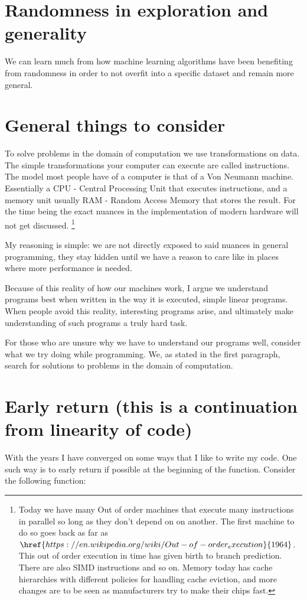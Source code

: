 \documentclass[a4paper]{article}
\begin{document}
\section{Randomness in exploration and generality}
We can learn much from how machine learning algorithms have been benefiting from randomness in order to not overfit into a specific dataset and remain more general.


\section{General things to consider}
To solve problems in the domain of computation we use transformations on data. The simple 
transformations your computer can execute are called instructions. The model most people 
have of a computer is that of a Von Neumann machine. Essentially a CPU - Central Processing 
Unit that executes instructions, and a memory unit usually RAM - Random Access Memory 
that stores the result. For the time being the exact nuances in the implementation of 
modern hardware will not get discussed. 
\footnote{Today we have many Out of order machines that execute many instructions in parallel so long as they don't depend on on another. The first machine to do so goes back as far as $\href{https://en.wikipedia.org/wiki/Out-of-order_execution}{1964}$. This out of order execution in time has given birth to branch prediction. There are also SIMD instructions and so on. Memory today has cache hierarchies with different policies for handling cache eviction, and more changes are to be seen as manufacturers try to make their chips fast.}  

My reasoning is simple: we are not directly exposed to said nuances in general programming, they stay hidden until we have a reason to care like in places where more performance is needed.

Because of this reality of how our machines work, I argue we understand programs best when written in the way it is executed, simple linear programs. When people avoid this reality, interesting programs arise, and ultimately make understanding of such programs a truly hard task.

For those who are unsure why we have to understand our programs well, consider what we try doing while programming. We, as stated in the first paragraph, search for solutions to problems in the domain of computation. 


\section{Early return (this is a continuation from linearity of code)}
With the years I have converged on some ways that I like to write my code. One such way is to early return if possible at the beginning of the function. Consider the following function:
\end{document}
